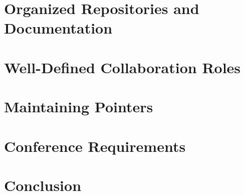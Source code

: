 \section{Organized Repositories and Documentation}

\section{Well-Defined Collaboration Roles}

\section{Maintaining Pointers}



\section{Conference Requirements}

\section{Conclusion}
